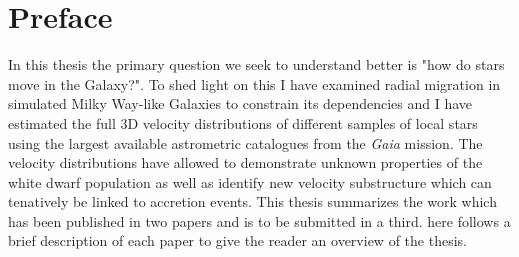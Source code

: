 \section*{Preface}
In this thesis the primary question we seek to understand better is "how do stars move in the Galaxy?". To shed light on this I have examined radial migration in simulated Milky Way-like Galaxies to constrain its dependencies and I have estimated the full 3D velocity distributions of different samples of local stars using the largest available astrometric catalogues from the \textit{Gaia} mission. The velocity distributions have allowed to demonstrate unknown properties of the white dwarf population as well as identify new velocity substructure which can tenatively be linked to accretion events.\newline
\newline
This thesis summarizes the work which has been published in two papers and is to be submitted in a third. here follows a brief description of each paper to give the reader an overview of the thesis.

